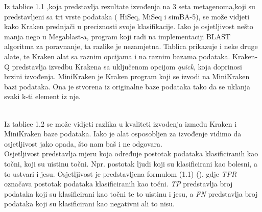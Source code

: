 \documentclass[times, utf8, zavrsni]{fer}
\begin{document}
Iz tablice 1.1 ,koja predstavlja rezultate izvođenja na 3 seta metagenoma,koji su predstavljeni sa tri vrste podataka ( HiSeq, MiSeq i simBA-5), se može vidjeti kako Kraken prednjači u preciznosti svoje klasifikacije. Iako je osjetljivost nešto manja nego u Megablast-a, program koji radi na implementaciji BLAST algoritma za poravnanje, ta razlike je nezamjetna. Tablica prikazuje i neke druge alate, te Kraken alat sa raznim opcijama i na raznim bazama podataka. Kraken-Q predstavlja izvedbu Krakena sa uključenom opcijom \textit{quick}, koja doprinosi brzini izvođenja. MiniKraken je Kraken program koji se izvodi na MiniKraken bazi podataka. Ona je stvorena iz originalne baze podataka tako da se uklanja svaki k-ti element iz nje.
\newline
\begin{table}[]
	\centering
	\caption{Usporedba kvalitete izvođenja Kraken-a i Minikraken-a. (\cite{Kraken})}
	\label{IsjecakTablice}
\end{table}
\\Iz tablice 1.2 se može vidjeti razlika u kvaliteti izvođenja između Kraken i MiniKraken baze podataka. Iako je alat osposobljen za izvođenje vidimo da osjetljivost jako opada, što nam baš i ne odgovara.
\\Osjetljivost predstavlja mjeru koja određuje postotak podataka klasificiranih kao točni, koji su uistinu točni. Npr. postotak ljudi koji su klasificirani kao bolesni, a to ustvari i jesu. Osjetljivost je predstavljena formulom (1.1) (\cite{Definicija}), gdje \textit{TPR} označava postotak podataka klasificiranih kao točni. \textit{TP} predstavlja broj podataka koji su klasificirani kao točni te to uistinu i jesu, a \textit{FN} predstavlja broj podataka koji su klasificirani kao negativni ali to nisu.
\end{document}
